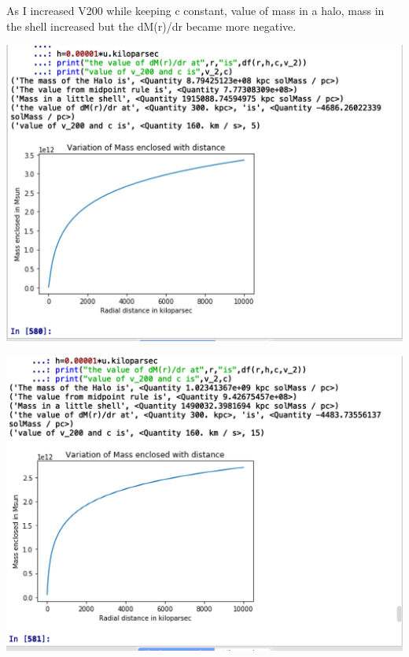 \documentclass{article}
\begin{document}
As I increased V200 while keeping c constant, value of mass in a halo, mass in the shell increased but the dM(r)/dr became more negative.
 
 
 \begin{center}
\begin{multicols}{2}
	\begin{center}
        \includegraphics[scale=0.25]{Images/5}
        \end{center}
\columnbreak
	\begin{center}
       \includegraphics[scale=0.25]{Images/15}
       \end{center}
\end{multicols}
\end{center}
\end{document}
